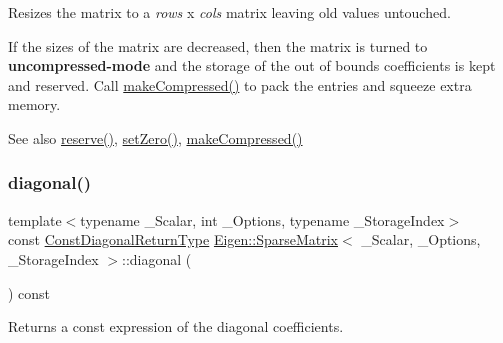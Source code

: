 Resizes the matrix to a {\itshape rows} x {\itshape cols} matrix leaving old values untouched.

If the sizes of the matrix are decreased, then the matrix is turned to {\bfseries{uncompressed-\/mode}} and the storage of the out of bounds coefficients is kept and reserved. Call \mbox{\hyperlink{class_eigen_1_1_sparse_matrix_a5ff54ffc10296f9466dc81fa888733fd}{make\+Compressed()}} to pack the entries and squeeze extra memory.

\begin{DoxySeeAlso}{See also}
\mbox{\hyperlink{class_eigen_1_1_sparse_matrix_a1518e58ac49bed0e2385b722a034f7d3}{reserve()}}, \mbox{\hyperlink{class_eigen_1_1_sparse_matrix_ad3c7416090f913e8685523cb3ab7c2f7}{set\+Zero()}}, \mbox{\hyperlink{class_eigen_1_1_sparse_matrix_a5ff54ffc10296f9466dc81fa888733fd}{make\+Compressed()}} 
\end{DoxySeeAlso}
\mbox{\label{class_eigen_1_1_sparse_matrix_a4423486f9fd64cbac7be06c748b37e0a}} 
\subsubsection{\texorpdfstring{diagonal()}{diagonal()}\hspace{0.1cm}{\footnotesize\ttfamily [1/2]}}
{\footnotesize\ttfamily template$<$typename \+\_\+\+Scalar, int \+\_\+\+Options, typename \+\_\+\+Storage\+Index$>$ \\
const \mbox{\hyperlink{class_eigen_1_1_diagonal}{Const\+Diagonal\+Return\+Type}} \mbox{\hyperlink{class_eigen_1_1_sparse_matrix}{Eigen\+::\+Sparse\+Matrix}}$<$ \+\_\+\+Scalar, \+\_\+\+Options, \+\_\+\+Storage\+Index $>$\+::diagonal (\begin{DoxyParamCaption}{ }\end{DoxyParamCaption}) const\hspace{0.3cm}{\ttfamily [inline]}}

\begin{DoxyReturn}{Returns}
a const expression of the diagonal coefficients. 
\end{DoxyReturn}
\mbox{\label{class_eigen_1_1_sparse_matrix_af83005640c2771ebd69f98848720ee52}} 
